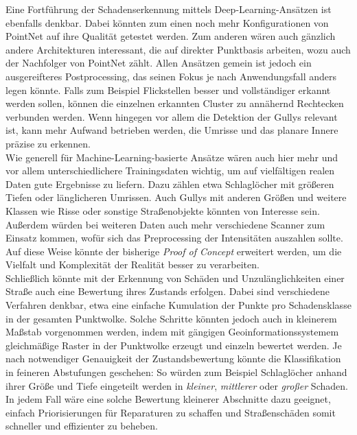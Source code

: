 Eine Fortführung der Schadenserkennung mittels Deep-Learning-Ansätzen ist ebenfalls denkbar. Dabei könnten zum einen noch mehr Konfigurationen von PointNet auf ihre Qualität getestet werden. Zum anderen wären auch gänzlich andere Architekturen interessant, die auf direkter Punktbasis arbeiten, wozu auch der Nachfolger von PointNet zählt. Allen Ansätzen gemein ist jedoch ein ausgereifteres Postprocessing, das seinen Fokus je nach Anwendungsfall anders legen könnte. Falls zum Beispiel Flickstellen besser und vollständiger erkannt werden sollen, können die einzelnen erkannten Cluster zu annähernd Rechtecken verbunden werden. Wenn hingegen vor allem die Detektion der Gullys relevant ist, kann mehr Aufwand betrieben werden, die Umrisse und das planare Innere präzise zu erkennen. \\
Wie generell für Machine-Learning-basierte Ansätze wären auch hier mehr und vor allem unterschiedlichere Trainingsdaten wichtig, um auf vielfältigen realen Daten gute Ergebnisse zu liefern. Dazu zählen etwa Schlaglöcher mit größeren Tiefen oder länglicheren Umrissen. Auch Gullys mit anderen Größen und weitere Klassen wie Risse oder sonstige Straßenobjekte könnten von Interesse sein. Außerdem würden bei weiteren Daten auch mehr verschiedene Scanner zum Einsatz kommen, wofür sich das Preprocessing der Intensitäten auszahlen sollte. Auf diese Weise könnte der bisherige \textit{Proof of Concept} erweitert werden, um die Vielfalt und Komplexität der Realität besser zu verarbeiten. \\
Schließlich könnte mit der Erkennung von Schäden und Unzulänglichkeiten einer Straße auch eine Bewertung ihres Zustands erfolgen. Dabei sind verschiedene Verfahren denkbar, etwa eine einfache Kumulation der Punkte pro Schadensklasse in der gesamten Punktwolke. Solche Schritte könnten jedoch auch in kleinerem Maßstab vorgenommen werden, indem mit gängigen Geoinformationssystemem gleichmäßige Raster in der Punktwolke erzeugt und einzeln bewertet werden. Je nach notwendiger Genauigkeit der Zustandsbewertung könnte die Klassifikation in feineren Abstufungen geschehen: So würden zum Beispiel Schlaglöcher anhand ihrer Größe und Tiefe eingeteilt werden in \textit{kleiner}, \textit{mittlerer} oder \textit{großer} Schaden. In jedem Fall wäre eine solche Bewertung kleinerer Abschnitte dazu geeignet, einfach Priorisierungen für Reparaturen zu schaffen und Straßenschäden somit schneller und effizienter zu beheben.